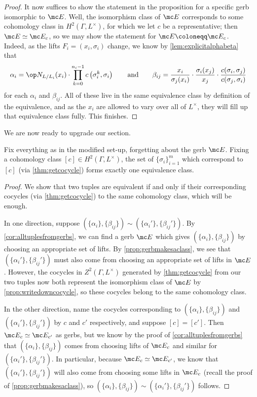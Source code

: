 \documentclass{article}
\numberwithin{equation}{section}
\begin{document}
\begin{proof}
	It now suffices to show the statement in the proposition for a specific gerb isomorphic to $\mc E$. Well, the isomorphism class of $\mc E$ corresponds to some cohomology class in $H^2(\Gamma,L^\times)$, for which we let $c$ be a representative; then $\mc E\simeq\mc E_c$, so we may show the statement for $\mc E\coloneqq\mc E_c$. Indeed, as the lifts $F_i=(x_i,\sigma_i)$ change, we know by \autoref{lem:explicitalphabeta} that
	\[\alpha_i=\op N_{L/L_i}(x_i)\cdot\prod_{k=0}^{n_i-1}c\left(\sigma_i^k,\sigma_i\right)\qquad\text{and}\qquad\beta_{ij}=\frac{x_i}{\sigma_j(x_i)}\cdot\frac{\sigma_i(x_j)}{x_j}\cdot\frac{c(\sigma_i,\sigma_j)}{c(\sigma_j,\sigma_i)}\]
	for each $\alpha_i$ and $\beta_{ij}$. All of these live in the same equivalence class by definition of the equivalence, and as the $x_i$ are allowed to vary over all of $L^\times$, they will fill up that equivalence class fully. This finishes.
\end{proof}
We are now ready to upgrade our section.
\begin{cor} \label{cor:cohomologymakesaclass}
	Fix everything as in the modified set-up, forgetting about the gerb $\mc E$. Fixing a cohomology class $[c]\in H^2(\Gamma,L^\times)$, the set of $\{\sigma_i\}_{i=1}^m$ which correspond to $[c]$ (via \autoref{thm:getcocycle}) forms exactly one equivalence class.
\end{cor}
\begin{proof}
	We show that two tuples are equivalent if and only if their corresponding cocycles (via \autoref{thm:getcocycle}) to the same cohomology class, which will be enough.
	
	In one direction, suppose $(\{\alpha_i\},\{\beta_{ij}\})\sim(\{\alpha_i'\},\{\beta_{ij}'\})$. By \autoref{cor:alltuplesfromgerbs}, we can find a gerb $\mc E$ which gives $(\{\alpha_i\},\{\beta_{ij}\})$ by choosing an appropriate set of lifts. By \autoref{prop:gerbmakesaclass}, we see that $(\{\alpha_i'\},\{\beta_{ij}'\})$ must also come from choosing an appropriate set of lifts in $\mc E$. However, the cocycles in $Z^2(\Gamma,L^\times)$ generated by \autoref{thm:getcocycle} from our two tuples now both represent the isomorphism class of $\mc E$ by \autoref{prop:writedowncocycle}, so these cocycles belong to the same cohomology class.

	In the other direction, name the cocycles corresponding to $(\{\alpha_i\},\{\beta_{ij}\})$ and $(\{\alpha_i'\},\{\beta_{ij}'\})$ by $c$ and $c'$ respectively, and suppose $[c]=[c']$. Then $\mc E_c\simeq\mc E_{c'}$ as gerbs, but we know by the proof of \autoref{cor:alltuplesfromgerbs} that $(\{\alpha_i\},\{\beta_{ij}\})$ comes from choosing lifts of $\mc E_c$ and similar for $(\{\alpha_i'\},\{\beta_{ij}'\})$. In particular, because $\mc E_c\simeq\mc E_{c'}$, we know that $(\{\alpha_i'\},\{\beta_{ij}'\})$ will also come from choosing some lifts in $\mc E_c$ (recall the proof of \autoref{prop:gerbmakesaclass}), so $(\{\alpha_i\},\{\beta_{ij}\})\sim(\{\alpha_i'\},\{\beta_{ij}'\})$ follows.
\end{proof}
\end{document}
